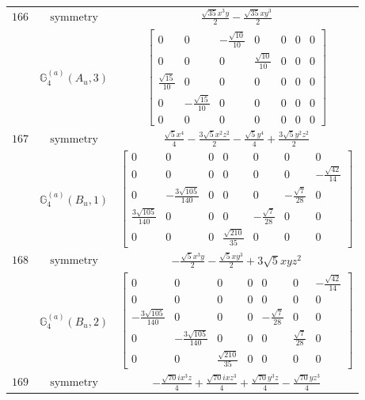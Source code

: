 \documentclass[fleqn,8pt,landscape]{jsarticle}
\begin{document}
\begin{longtable}{ccc}
$ 166 $ & $ \text{symmetry} $ & $ \frac{\sqrt{35} x^{3} y}{2} - \frac{\sqrt{35} x y^{3}}{2} $ \\
$  $ & $ \mathbb{G}_{4}^{(a)}(A_{u},3) $ & $ \begin{bmatrix} 0 & 0 & - \frac{\sqrt{10}}{10} & 0 & 0 & 0 & 0 \\ 0 & 0 & 0 & \frac{\sqrt{10}}{10} & 0 & 0 & 0 \\ \frac{\sqrt{15}}{10} & 0 & 0 & 0 & 0 & 0 & 0 \\ 0 & - \frac{\sqrt{15}}{10} & 0 & 0 & 0 & 0 & 0 \\ 0 & 0 & 0 & 0 & 0 & 0 & 0 \end{bmatrix} $ \\ \hline
$ 167 $ & $ \text{symmetry} $ & $ \frac{\sqrt{5} x^{4}}{4} - \frac{3 \sqrt{5} x^{2} z^{2}}{2} - \frac{\sqrt{5} y^{4}}{4} + \frac{3 \sqrt{5} y^{2} z^{2}}{2} $ \\
$  $ & $ \mathbb{G}_{4}^{(a)}(B_{u},1) $ & $ \begin{bmatrix} 0 & 0 & 0 & 0 & 0 & 0 & 0 \\ 0 & 0 & 0 & 0 & 0 & 0 & - \frac{\sqrt{42}}{14} \\ 0 & - \frac{3 \sqrt{105}}{140} & 0 & 0 & 0 & - \frac{\sqrt{7}}{28} & 0 \\ \frac{3 \sqrt{105}}{140} & 0 & 0 & 0 & - \frac{\sqrt{7}}{28} & 0 & 0 \\ 0 & 0 & 0 & \frac{\sqrt{210}}{35} & 0 & 0 & 0 \end{bmatrix} $ \\ \hline
$ 168 $ & $ \text{symmetry} $ & $ - \frac{\sqrt{5} x^{3} y}{2} - \frac{\sqrt{5} x y^{3}}{2} + 3 \sqrt{5} x y z^{2} $ \\
$  $ & $ \mathbb{G}_{4}^{(a)}(B_{u},2) $ & $ \begin{bmatrix} 0 & 0 & 0 & 0 & 0 & 0 & - \frac{\sqrt{42}}{14} \\ 0 & 0 & 0 & 0 & 0 & 0 & 0 \\ - \frac{3 \sqrt{105}}{140} & 0 & 0 & 0 & - \frac{\sqrt{7}}{28} & 0 & 0 \\ 0 & - \frac{3 \sqrt{105}}{140} & 0 & 0 & 0 & \frac{\sqrt{7}}{28} & 0 \\ 0 & 0 & \frac{\sqrt{210}}{35} & 0 & 0 & 0 & 0 \end{bmatrix} $ \\ \hline
$ 169 $ & $ \text{symmetry} $ & $ - \frac{\sqrt{70} i x^{3} z}{4} + \frac{\sqrt{70} i x z^{3}}{4} + \frac{\sqrt{70} y^{3} z}{4} - \frac{\sqrt{70} y z^{3}}{4} $ \\

\end{longtable}
\end{document}

